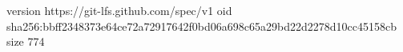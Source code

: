 version https://git-lfs.github.com/spec/v1
oid sha256:bbff2348373e64ce72a72917642f0bd06a698c65a29bd22d2278d10cc45158cb
size 774
